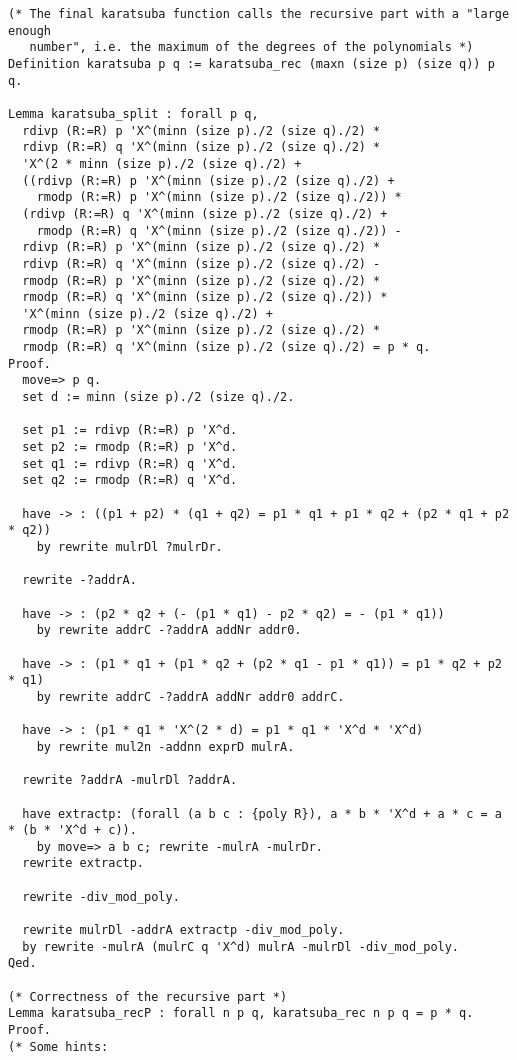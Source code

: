 \documentclass[a4paper]{article}
\begin{document}
\begin{verbatim}
(* The final karatsuba function calls the recursive part with a "large enough
   number", i.e. the maximum of the degrees of the polynomials *)
Definition karatsuba p q := karatsuba_rec (maxn (size p) (size q)) p q.

Lemma karatsuba_split : forall p q,
  rdivp (R:=R) p 'X^(minn (size p)./2 (size q)./2) *
  rdivp (R:=R) q 'X^(minn (size p)./2 (size q)./2) *
  'X^(2 * minn (size p)./2 (size q)./2) +
  ((rdivp (R:=R) p 'X^(minn (size p)./2 (size q)./2) +
    rmodp (R:=R) p 'X^(minn (size p)./2 (size q)./2)) *
  (rdivp (R:=R) q 'X^(minn (size p)./2 (size q)./2) +
    rmodp (R:=R) q 'X^(minn (size p)./2 (size q)./2)) -
  rdivp (R:=R) p 'X^(minn (size p)./2 (size q)./2) *
  rdivp (R:=R) q 'X^(minn (size p)./2 (size q)./2) -
  rmodp (R:=R) p 'X^(minn (size p)./2 (size q)./2) *
  rmodp (R:=R) q 'X^(minn (size p)./2 (size q)./2)) *
  'X^(minn (size p)./2 (size q)./2) +
  rmodp (R:=R) p 'X^(minn (size p)./2 (size q)./2) *
  rmodp (R:=R) q 'X^(minn (size p)./2 (size q)./2) = p * q.
Proof.
  move=> p q.
  set d := minn (size p)./2 (size q)./2.

  set p1 := rdivp (R:=R) p 'X^d.
  set p2 := rmodp (R:=R) p 'X^d.
  set q1 := rdivp (R:=R) q 'X^d.
  set q2 := rmodp (R:=R) q 'X^d.

  have -> : ((p1 + p2) * (q1 + q2) = p1 * q1 + p1 * q2 + (p2 * q1 + p2 * q2))
    by rewrite mulrDl ?mulrDr.

  rewrite -?addrA.

  have -> : (p2 * q2 + (- (p1 * q1) - p2 * q2) = - (p1 * q1))
    by rewrite addrC -?addrA addNr addr0.

  have -> : (p1 * q1 + (p1 * q2 + (p2 * q1 - p1 * q1)) = p1 * q2 + p2 * q1)
    by rewrite addrC -?addrA addNr addr0 addrC.

  have -> : (p1 * q1 * 'X^(2 * d) = p1 * q1 * 'X^d * 'X^d)
    by rewrite mul2n -addnn exprD mulrA.

  rewrite ?addrA -mulrDl ?addrA.

  have extractp: (forall (a b c : {poly R}), a * b * 'X^d + a * c = a * (b * 'X^d + c)).
    by move=> a b c; rewrite -mulrA -mulrDr.
  rewrite extractp.

  rewrite -div_mod_poly.

  rewrite mulrDl -addrA extractp -div_mod_poly.
  by rewrite -mulrA (mulrC q 'X^d) mulrA -mulrDl -div_mod_poly.
Qed.

(* Correctness of the recursive part *)
Lemma karatsuba_recP : forall n p q, karatsuba_rec n p q = p * q.
Proof.
(* Some hints:


\end{verbatim}
\end{document}
